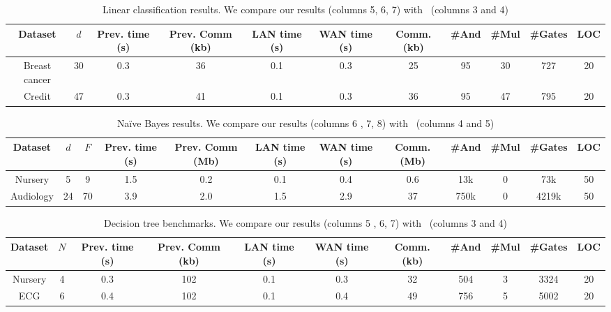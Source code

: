 \begin{table*}
\begin{tabular}{c|c|c|c|c |c|c|c|c|c|c}
Dataset & $d$  & Prev. time (s) & Prev. Comm (kb) & LAN time (s) & WAN time (s) & Comm. (kb)  & \#And & \#Mul & \#Gates & LOC\\
\hline
Breast cancer & 30 & 0.3 & 36 & 0.1 & 0.3 & 25 & 95 & 30 & 727 & 20\\
\hline
Credit & 47 & 0.3 & 41 & 0.1 & 0.3 & 36 & 95 & 47 & 795 & 20\\
\hline
\end{tabular}

 \caption{Linear classification results. We compare our results (columns 5, 6, 7) with~\cite{shafindss} (columns 3 and 4)}
 \label{tab:lc} 
\end{table*}

\begin{table*}
\begin{tabular}{c|c|c|c|c|c |c|c|c|c|c|c}
Dataset & $d$ & $F$ & Prev. time (s) & Prev. Comm (Mb) & LAN time (s) & WAN time (s) & Comm. (Mb)  & \#And & \#Mul & \#Gates  & LOC\\
\hline
Nursery & 5 & 9 & 1.5 & 0.2 & 0.1 & 0.4 & 0.6 & 13k & 0 & 73k & 50\\
\hline
Audiology & 24 & 70 & 3.9 & 2.0 & 1.5 & 2.9 & 37 & 750k & 0 & 4219k & 50\\
\hline
\end{tabular}

 \caption{Na\"{i}ve Bayes results. We compare our results (columns 6 , 7, 8) with~\cite{shafindss} (columns 4 and 5)}
 \label{tab:nb} 
\end{table*}

\begin{table*}
\begin{tabular}{c|c|c|c |c|c|c|c|c|c|c}
Dataset  & $N$ & Prev. time (s) & Prev. Comm (kb) & LAN time (s) & WAN time (s) & Comm. (kb)  & \#And & \#Mul & \#Gates & LOC\\
\hline
Nursery & 4 & 0.3 & 102 & 0.1 & 0.3 & 32 & 504 & 3 & 3324 & 20\\
\hline
ECG &  6 & 0.4 & 102 & 0.1 & 0.4 & 49 & 756 & 5 & 5002 & 20\\
\hline
\end{tabular}

 \caption{Decision tree benchmarks. We compare our results (columns 5 , 6, 7) with~\cite{wu} (columns 3 and 4)}
 \label{tab:dt} 
\end{table*}



